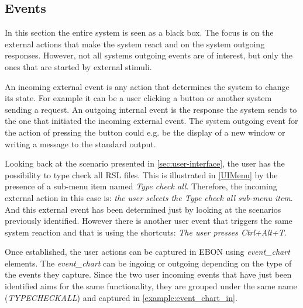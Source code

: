 \documentclass[conference]{IEEEtran}
\begin{document}
%
\subsection{Events}
\label{sec:events}

In this section the entire system is seen as a black box. The focus is
on the external actions that make the system react and on the system
outgoing responses. However, not all systems outgoing events are of
interest, but only the ones that are started by external stimuli. 

An incoming external event is any action that determines the system to
change its state. For example it can be a user clicking a button or
another system sending a request. An outgoing internal event is the
response the system sends to the one that initiated the incoming
external event. The system outgoing event for the action of pressing
the button could e.g. be the display of a new window or writing a
message to the standard output.

Looking back at the scenario presented in
\autoref{sec:user-interface}, the user has the possibility to type
check all RSL files. This is illustrated in \autoref{UIMenu} by the
presence of a sub-menu item named \emph{Type check all}. Therefore,
the incoming external action in this case is: \emph{the user selects
the Type check all sub-menu item}. And this external event has been determined
just by looking at the scenarios previously identified. However there
is another user event that triggers the same system reaction and that
is using the shortcuts: \emph{The user presses Ctrl+Alt+T}.



Once established, the user actions can be captured in EBON using
\emph{event\_chart} elements. The \emph{event\_chart} can be ingoing
or outgoing depending on the type of the events they capture. Since
the two user incoming events that have just been identified aims for
the same functionality, they are grouped under the same name
(\emph{TYPECHECKALL}) and captured in
\autoref{example:event_chart_in}.


\end{document}
